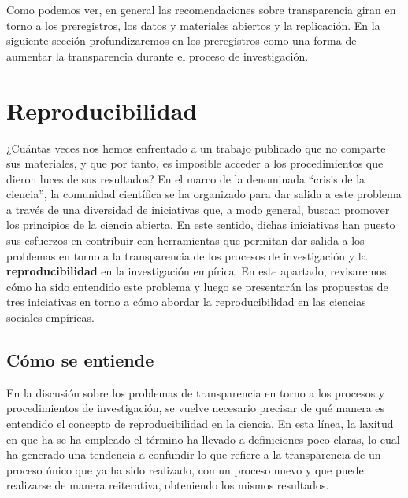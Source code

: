 \documentclass[
]{book}
\begin{document}
Como podemos ver, en general las recomendaciones sobre transparencia giran en torno a los preregistros, los datos y materiales abiertos y la replicación. En la siguiente sección profundizaremos en los preregistros como una forma de aumentar la transparencia durante el proceso de investigación.

\hypertarget{reproducibilidad}{%
\chapter{Reproducibilidad}\label{reproducibilidad}}

¿Cuántas veces nos hemos enfrentado a un trabajo publicado que no comparte sus materiales, y que por tanto, es imposible acceder a los procedimientos que dieron luces de sus resultados? En el marco de la denominada ``crisis de la ciencia'', la comunidad científica se ha organizado para dar salida a este problema a través de una diversidad de iniciativas que, a modo general, buscan promover los principios de la ciencia abierta. En este sentido, dichas iniciativas han puesto sus esfuerzos en contribuir con herramientas que permitan dar salida a los problemas en torno a la transparencia de los procesos de investigación y la \textbf{reproducibilidad} en la investigación empírica. En este apartado, revisaremos cómo ha sido entendido este problema y luego se presentarán las propuestas de tres iniciativas en torno a cómo abordar la reproducibilidad en las ciencias sociales empíricas.

\hypertarget{cuxf3mo-se-entiende}{%
\section{Cómo se entiende}\label{cuxf3mo-se-entiende}}

En la discusión sobre los problemas de transparencia en torno a los procesos y procedimientos de investigación, se vuelve necesario precisar de qué manera es entendido el concepto de reproducibilidad en la ciencia. En esta línea, la laxitud en que ha se ha empleado el término ha llevado a definiciones poco claras, lo cual ha generado una tendencia a confundir lo que refiere a la transparencia de un proceso único que ya ha sido realizado, con un proceso nuevo y que puede realizarse de manera reiterativa, obteniendo los mismos resultados.
\end{document}
